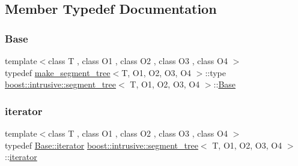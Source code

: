 \subsection{Member Typedef Documentation}
\mbox{\label{classboost_1_1intrusive_1_1segment__tree_a56984f6fac5fb61618c53ca07704cf45}} 
\subsubsection{\texorpdfstring{Base}{Base}}
{\footnotesize\ttfamily template$<$class T , class O1 , class O2 , class O3 , class O4 $>$ \\
typedef \hyperlink{structboost_1_1intrusive_1_1make__segment__tree}{make\+\_\+segment\+\_\+tree}$<$T, O1, O2, O3, O4 $>$\+::type \hyperlink{classboost_1_1intrusive_1_1segment__tree}{boost\+::intrusive\+::segment\+\_\+tree}$<$ T, O1, O2, O3, O4 $>$\+::\hyperlink{classboost_1_1intrusive_1_1segment__tree_a56984f6fac5fb61618c53ca07704cf45}{Base}}

\mbox{\label{classboost_1_1intrusive_1_1segment__tree_a20e4825aed9b33d2de0b7f4177bacd7b}} 
\subsubsection{\texorpdfstring{iterator}{iterator}}
{\footnotesize\ttfamily template$<$class T , class O1 , class O2 , class O3 , class O4 $>$ \\
typedef \hyperlink{classboost_1_1intrusive_1_1segment__tree__impl_a9f1be9b01be5078fb59b2e34520b374a}{Base\+::iterator} \hyperlink{classboost_1_1intrusive_1_1segment__tree}{boost\+::intrusive\+::segment\+\_\+tree}$<$ T, O1, O2, O3, O4 $>$\+::\hyperlink{classboost_1_1intrusive_1_1segment__tree__impl_a9f1be9b01be5078fb59b2e34520b374a}{iterator}}

\mbox{\label{classboost_1_1intrusive_1_1segment__tree_aaff3016f655ec2b1dfe44282913cefea}} 
